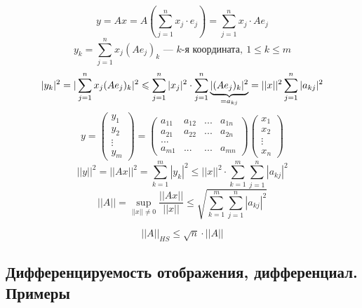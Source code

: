 \documentclass[main]{subfiles}
\begin{document}
	\begin{Proof}
		\[y = Ax = A(\sum_{j = 1}^n x_j \cdot e_j) = \sum^n_{j = 1} x_j \cdot Ae_j\]
		\[y_k = \sum^n_{j = 1}x_j(Ae_j)_k \text{ --- $k$-я координата},\ 1 \leq k \leq m\]
		\[|y_k|^2 = |\sum^n_{j = 1} x_j (Ae_j)_k|^2 \leq \sum_{j = 1}^n |x_j|^2 \cdot
			\sum^n_{j=1} \ub{= a_{kj} }{|(Ae_j)_k|^2} = ||x||^2 \sum^n_{j = 1} |a_{kj}|^2\]
		\[y = \begin{pmatrix}
				y_1    \\
				y_2    \\
				\vdots \\
				y_m
			\end{pmatrix}
			= \begin{pmatrix}
				a_{11} & a_{12} & ... & a_{1n} \\
				a_{21} & a_{22} & ... & a_{2n} \\
				...                            \\
				a_{m1} & ...    & ... & a_{mn}
			\end{pmatrix}
			\begin{pmatrix}
				x_1    \\
				x_2    \\
				\vdots \\
				x_n
			\end{pmatrix}
		\]
		\[||y||^2 = ||Ax||^2 = \sum^m_{k = 1}|y_k|^2 \leq ||x||^2 \cdot \sum^m_{k = 1}\sum^n_{j = 1} |a_{kj}|^2\]
		\[||A|| = \sup_{||x|| \neq 0} \frac{||Ax||}{||x||} \leq \sqrt{\sum^m_{k = 1} \sum^n_{j = 1} |a_{kj}|^2}\]
	\end{Proof}

	\begin{Upr}
		\[||A||_{HS} \leq \sqrt{n} \cdot ||A||\]
	\end{Upr}

	\newpage
	\subsection{Дифференцируемость отображения, дифференциал. Примеры}
\end{document}
